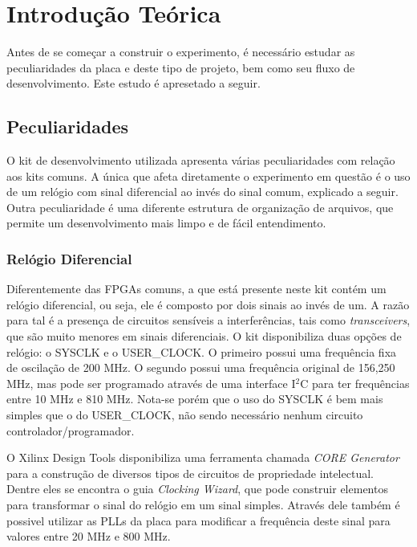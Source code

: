 \documentclass[11pt,a4paper,oneside]{book}
\begin{document}
\section{Introdução Teórica}
Antes de se começar a construir o experimento, é necessário estudar as peculiaridades da placa e deste tipo de projeto, bem como seu fluxo de desenvolvimento.
Este estudo é apresetado a seguir.

\subsection{Peculiaridades}
O kit de desenvolvimento utilizada apresenta várias peculiaridades com relação aos kits comuns.
A única que afeta diretamente o experimento em questão é o uso de um relógio com sinal diferencial ao invés do sinal comum, explicado a seguir.
Outra peculiaridade é uma diferente estrutura de organização de arquivos, que permite um desenvolvimento mais limpo e de fácil entendimento.

\subsubsection{Relógio Diferencial}
Diferentemente das FPGAs comuns, a que está presente neste kit contém um relógio diferencial, ou seja, ele é composto por dois sinais ao invés de um.
A razão para tal é a presença de circuitos sensíveis a interferências, tais como \textit{transceivers}, que são muito menores em sinais diferenciais.
O kit disponibiliza duas opções de relógio: o SYSCLK e o USER\_CLOCK.
O primeiro possui uma frequência fixa de oscilação de 200 MHz.
O segundo possui uma frequência original de 156,250 MHz, mas pode ser programado através de uma interface I$^2$C para ter frequências entre 10 MHz e 810 MHz.
Nota-se porém que o uso do SYSCLK é bem mais simples que o do USER\_CLOCK, não sendo necessário nenhum circuito controlador/programador.

O Xilinx Design Tools disponibiliza uma ferramenta chamada \textit{CORE Generator} para a construção de diversos tipos de circuitos de propriedade intelectual.
Dentre eles se encontra o guia \textit{Clocking Wizard}, que pode construir elementos para transformar o sinal do relógio em um sinal simples.
Através dele também é possivel utilizar as PLLs da placa para modificar a frequência deste sinal para valores entre 20 MHz e 800 MHz.
\end{document}
